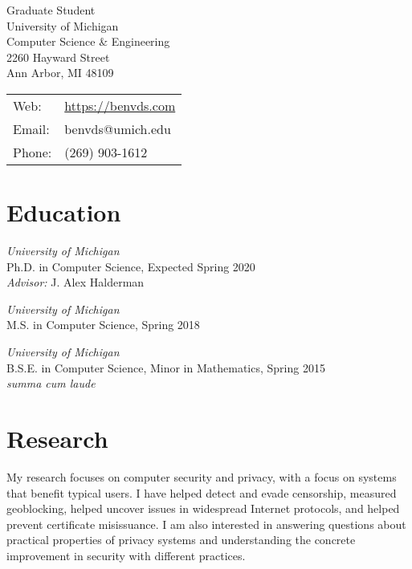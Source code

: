 \documentclass[margin,11pt]{res} %
\begin{document}
\begin{adjustwidth}{-1.3in}{0pt}
\vspace{20pt}

\noindent 
\parbox[m]{4in}{
Graduate Student \\
University of Michigan\\
Computer Science \& Engineering\\
2260 Hayward Street\\
Ann Arbor, MI  48109
}
\begin{tabular}{ll}
{Web}:&\url{https://benvds.com}\\
{Email}:&benvds@umich.edu\\
{Phone}:& (269) 903-1612
\end{tabular}
\vspace{10pt}
\end{adjustwidth}

\section{\large Education}

        \emph{University of Michigan}\\
        Ph.D. in Computer Science, Expected Spring 2020\\
        \emph{Advisor:} J. Alex Halderman
		
        \emph{University of Michigan}\\
        M.S. in Computer Science, Spring 2018

        \emph{University of Michigan}\\
        B.S.E. in Computer Science, Minor in Mathematics, Spring 2015\\
		\emph{summa cum laude}


\vspace{6pt}
\section{\large Research}

My research focuses on computer security and privacy, with a focus on systems that benefit typical users. I have helped detect and evade censorship, measured geoblocking, helped uncover issues in widespread Internet protocols, and helped prevent certificate misissuance.
I am also interested in answering questions about practical properties of privacy systems and understanding the concrete improvement in security with different practices.
\end{document}
